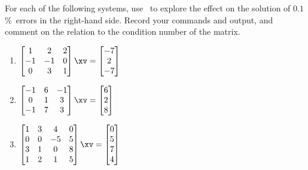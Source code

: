 \begin{exercise} \label{ex:} 
For each of the following systems, use \script\ to explore the effect on the solution of \(0.1\)\%~errors in the right-hand side.
Record your commands and output, and comment on the relation to the  condition number of the matrix.

\begin{enumerate}
\itemsep=5ex

\item \(\begin{bmatrix} 1&2&2
\\-1&-1&0
\\0&3&1 \end{bmatrix}\xv
=\begin{bmatrix} -7
\\2
\\-7 \end{bmatrix}\)
\setbox\ajrqrbox\hbox{}%
\marginpar{\usebox{\ajrqrbox\\[2ex]}}%

\item \(\begin{bmatrix} -1&6&-1
\\0&1&3
\\-1&7&3 \end{bmatrix}\xv
=\begin{bmatrix} 6
\\2
\\8 \end{bmatrix}\)
\setbox\ajrqrbox\hbox{}%
\marginpar{\usebox{\ajrqrbox\\[2ex]}}%

\item \(\begin{bmatrix} 1&3&4&0
\\0&0&-5&5
\\3&1&0&8
\\1&2&1&5 \end{bmatrix}\xv
=\begin{bmatrix} 0
\\5
\\7
\\4 \end{bmatrix}\)
\setbox\ajrqrbox\hbox{}%
\marginpar{\usebox{\ajrqrbox\\[2ex]}}%


\end{enumerate}
\end{exercise}
